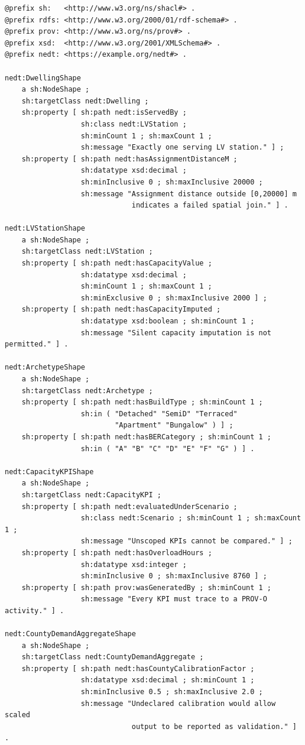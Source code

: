 \documentclass[preprint,12pt]{elsarticle}
\begin{document}
\begin{verbatim}
@prefix sh:   <http://www.w3.org/ns/shacl#> .
@prefix rdfs: <http://www.w3.org/2000/01/rdf-schema#> .
@prefix prov: <http://www.w3.org/ns/prov#> .
@prefix xsd:  <http://www.w3.org/2001/XMLSchema#> .
@prefix nedt: <https://example.org/nedt#> .

nedt:DwellingShape
    a sh:NodeShape ;
    sh:targetClass nedt:Dwelling ;
    sh:property [ sh:path nedt:isServedBy ;
                  sh:class nedt:LVStation ;
                  sh:minCount 1 ; sh:maxCount 1 ;
                  sh:message "Exactly one serving LV station." ] ;
    sh:property [ sh:path nedt:hasAssignmentDistanceM ;
                  sh:datatype xsd:decimal ;
                  sh:minInclusive 0 ; sh:maxInclusive 20000 ;
                  sh:message "Assignment distance outside [0,20000] m
                              indicates a failed spatial join." ] .

nedt:LVStationShape
    a sh:NodeShape ;
    sh:targetClass nedt:LVStation ;
    sh:property [ sh:path nedt:hasCapacityValue ;
                  sh:datatype xsd:decimal ;
                  sh:minCount 1 ; sh:maxCount 1 ;
                  sh:minExclusive 0 ; sh:maxInclusive 2000 ] ;
    sh:property [ sh:path nedt:hasCapacityImputed ;
                  sh:datatype xsd:boolean ; sh:minCount 1 ;
                  sh:message "Silent capacity imputation is not permitted." ] .

nedt:ArchetypeShape
    a sh:NodeShape ;
    sh:targetClass nedt:Archetype ;
    sh:property [ sh:path nedt:hasBuildType ; sh:minCount 1 ;
                  sh:in ( "Detached" "SemiD" "Terraced"
                          "Apartment" "Bungalow" ) ] ;
    sh:property [ sh:path nedt:hasBERCategory ; sh:minCount 1 ;
                  sh:in ( "A" "B" "C" "D" "E" "F" "G" ) ] .

nedt:CapacityKPIShape
    a sh:NodeShape ;
    sh:targetClass nedt:CapacityKPI ;
    sh:property [ sh:path nedt:evaluatedUnderScenario ;
                  sh:class nedt:Scenario ; sh:minCount 1 ; sh:maxCount 1 ;
                  sh:message "Unscoped KPIs cannot be compared." ] ;
    sh:property [ sh:path nedt:hasOverloadHours ;
                  sh:datatype xsd:integer ;
                  sh:minInclusive 0 ; sh:maxInclusive 8760 ] ;
    sh:property [ sh:path prov:wasGeneratedBy ; sh:minCount 1 ;
                  sh:message "Every KPI must trace to a PROV-O activity." ] .

nedt:CountyDemandAggregateShape
    a sh:NodeShape ;
    sh:targetClass nedt:CountyDemandAggregate ;
    sh:property [ sh:path nedt:hasCountyCalibrationFactor ;
                  sh:datatype xsd:decimal ; sh:minCount 1 ;
                  sh:minInclusive 0.5 ; sh:maxInclusive 2.0 ;
                  sh:message "Undeclared calibration would allow scaled
                              output to be reported as validation." ] .
\end{verbatim}
\end{document}
